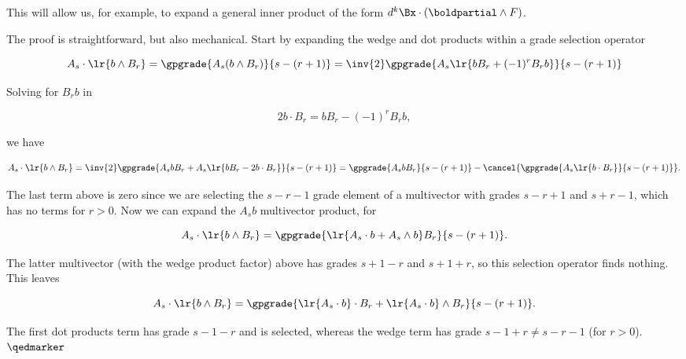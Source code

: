 %
%

This will allow us, for example, to expand a general inner product of the form \(d^k \Bx \cdot (\boldpartial \wedge F)\).

The proof is straightforward, but also mechanical.  Start by expanding the wedge and dot products within a grade selection operator

\begin{dmath}\label{eqn:stokesTheoremGeometricAlgebra:1460}
A_s \cdot \lr{ b \wedge B_r }
=
\gpgrade{A_s (b \wedge B_r)}{s - (r + 1)}
=
\inv{2} \gpgrade{A_s \lr{b B_r + (-1)^{r} B_r b} }{s - (r + 1)}
\end{dmath}

Solving for \(B_r b\) in

\begin{dmath}\label{eqn:stokesTheoremGeometricAlgebra:1480}
2 b \cdot B_r = b B_r - (-1)^{r} B_r b,
\end{dmath}

we have

\begin{dmath}\label{eqn:stokesTheoremGeometricAlgebra:1500}
A_s \cdot \lr{ b \wedge B_r }
=
\inv{2} \gpgrade{ A_s b B_r + A_s \lr{ b B_r - 2 b \cdot B_r } }{s - (r + 1)}
=
\gpgrade{ A_s b B_r }{s - (r + 1)}
-
\cancel{\gpgrade{ A_s \lr{ b \cdot B_r } }{s - (r + 1)}}.
\end{dmath}

The last term above is zero since we are selecting the \(s - r - 1\) grade element of a multivector with grades \(s - r + 1\) and \(s + r - 1\), which has no terms for \(r > 0\).  Now we can expand the \(A_s b\) multivector product, for

\begin{dmath}\label{eqn:stokesTheoremGeometricAlgebra:1520}
A_s \cdot \lr{ b \wedge B_r }
=
\gpgrade{ \lr{ A_s \cdot b + A_s \wedge b} B_r }{s - (r + 1)}.
\end{dmath}

The latter multivector (with the wedge product factor) above has grades \(s + 1 - r\) and \(s + 1 + r\), so this selection operator finds nothing.  This leaves

\begin{dmath}\label{eqn:stokesTheoremGeometricAlgebra:1540}
A_s \cdot \lr{ b \wedge B_r }
=
\gpgrade{
\lr{ A_s \cdot b } \cdot B_r
+ \lr{ A_s \cdot b } \wedge B_r
}{s - (r + 1)}.
\end{dmath}

The first dot products term has grade \(s - 1 - r\) and is selected, whereas the wedge term has grade \(s - 1 + r \ne s - r - 1\) (for \(r > 0\)).  \(\qedmarker\)



